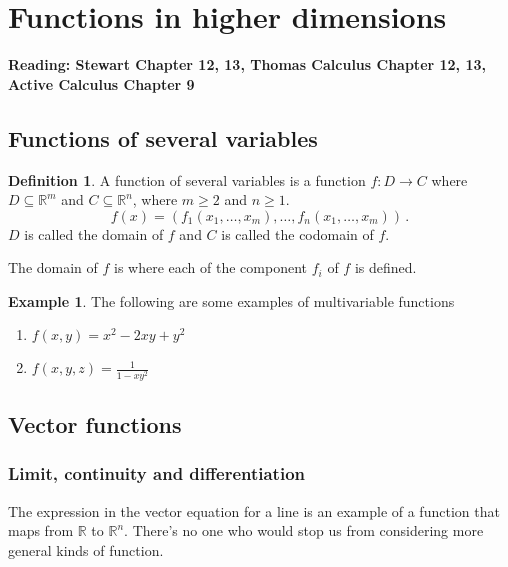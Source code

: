 \documentclass[
]{article}
\theoremstyle{definition}
\newtheorem{definition}{Definition}[section]
\theoremstyle{definition}
\newtheorem{example}{Example}[section]
\theoremstyle{definition}
\theoremstyle{definition}
\theoremstyle{remark}
\begin{document}
\newpage

\section{Functions in higher dimensions}\label{functions-in-higher-dimensions}

\textbf{Reading: Stewart Chapter 12, 13, Thomas Calculus Chapter 12, 13, Active Calculus Chapter 9}

\subsection{Functions of several variables}\label{functions-of-several-variables}

\begin{definition}
A function of several variables is a function
\(f: D \to C\) where \(D \subseteq \mathbb{R}^m\) and \(C \subseteq \mathbb{R}^n\), where \(m\geq 2\) and \(n\geq 1\).
\[f({x}) = ( f_1(x_1,\dots, x_m),\dots, f_n(x_1,\dots, x_m)  ) \,.\]
\(D\) is called the domain of \(f\) and \(C\) is called the codomain of \(f\).
\end{definition}

The domain of \(f\) is where each of the component \(f_i\) of \(f\) is defined.

\begin{example}

The following are some examples of multivariable functions

\begin{enumerate}
\def\labelenumi{\arabic{enumi}.}
\item
  \(f(x,y) = x^2 - 2xy + y^2\)
\item
  \(f(x,y,z) = \frac{1}{1 - xy^2}\)
\end{enumerate}

\end{example}

\subsection{Vector functions}\label{vector-functions}

\subsubsection{Limit, continuity and differentiation}\label{limit-continuity-and-differentiation}

The expression in the vector equation for a line is an example of a function that maps from \(\mathbb{R}\) to \(\mathbb{R}^n\).
There's no one who would stop us from considering more general kinds of function.
\end{document}
